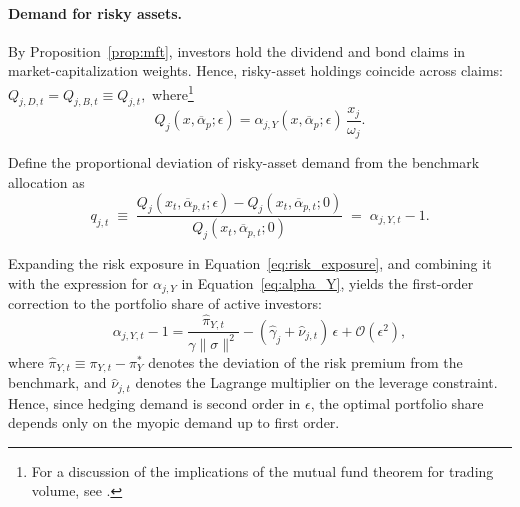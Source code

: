 \documentclass[12pt,english]{article}
\begin{document}


\paragraph{Demand for risky assets.}

By Proposition~\ref{prop:mft}, investors hold the dividend and bond claims in market-capitalization weights.
Hence, risky-asset holdings coincide across claims:
$
    Q_{j,D,t}=Q_{j,B,t}\equiv Q_{j,t},
$
where\footnote{For a discussion of the implications of the mutual fund theorem for trading volume, see \citet{loWang2000tradingVolume}.}
\[
    Q_j(x,\overline{\alpha}_p;\epsilon)
    =
    \alpha_{j,Y}(x,\overline{\alpha}_p;\epsilon)\,
    \frac{x_j}{\omega_j}.
\]


Define the proportional deviation of risky-asset demand from the benchmark allocation as
\begin{equation}
    q_{j,t}
    \;\equiv\;
    \frac{Q_j(x_t,\overline{\alpha}_{p,t};\epsilon)-Q_j(x_t,\overline{\alpha}_{p,t};0)}
    {Q_j(x_t,\overline{\alpha}_{p,t};0)}
    \;=\;
    \alpha_{j,Y,t}-1.
\end{equation}

Expanding the risk exposure in Equation~\eqref{eq:risk_exposure}, and combining it with the expression for $\alpha_{j,Y}$ in Equation~\eqref{eq:alpha_Y}, yields the first-order correction to the portfolio share of active investors:
\begin{equation}
    \alpha_{j,Y,t}-1
    =
    \frac{\hat{\pi}_{Y,t}}{\gamma \|\sigma\|^2}
    -
    (\hat{\gamma}_{j}+\hat{\nu}_{j,t})\,\epsilon
    +
    \mathcal{O}(\epsilon^2),
\end{equation}
where $\hat{\pi}_{Y,t}\equiv \pi_{Y,t}-\pi_Y^{*}$ denotes the deviation of the risk premium from the benchmark, and $\hat{\nu}_{j,t}$ denotes the Lagrange multiplier on the leverage constraint.
Hence, since hedging demand is second order in $\epsilon$, the optimal portfolio share depends only on the myopic demand up to first order.
\end{document}
